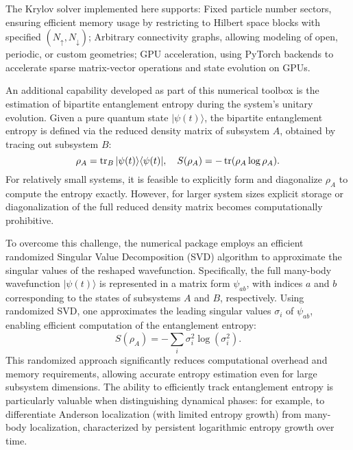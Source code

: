 The Krylov solver implemented here supports: {Fixed particle number sectors}, ensuring efficient memory usage by restricting to Hilbert space blocks with specified $(N_\uparrow, N_\downarrow)$; {Arbitrary connectivity graphs}, allowing modeling of open, periodic, or custom geometries; {GPU acceleration}, using PyTorch backends to accelerate sparse matrix-vector operations and state evolution on GPUs.


An additional capability developed as part of this numerical toolbox is the estimation of bipartite entanglement entropy during the system's unitary evolution. Given a pure quantum state $|\psi(t)\rangle$, the bipartite entanglement entropy is defined via the reduced density matrix of subsystem $A$, obtained by tracing out subsystem $B$:
\begin{equation}
\rho_A = \mathop{\mathrm{tr}}\nolimits_B |\psi(t)\rangle \langle \psi(t)|,\quad
S(\rho_A) = -\mathop{\mathrm{tr}}\nolimits(\rho_A \log \rho_A).
\end{equation}
For relatively small systems, it is feasible to explicitly form and diagonalize $\rho_A$ to compute the entropy exactly. However, for larger system sizes explicit storage or diagonalization of the full reduced density matrix becomes computationally prohibitive.

To overcome this challenge, the numerical package employs an efficient randomized Singular Value Decomposition (SVD) algorithm \cite{halko_finding_2011} to approximate the singular values of the reshaped wavefunction. Specifically, the full many-body wavefunction $|\psi(t)\rangle$ is represented in a matrix form $\psi_{ab}$, with indices $a$ and $b$ corresponding to the states of subsystems $A$ and $B$, respectively. Using randomized SVD, one approximates the leading singular values ${\sigma_i}$ of $\psi_{ab}$, enabling efficient computation of the entanglement entropy:
\begin{equation}
S(\rho_A) = -\sum_i \sigma_i^2 \log(\sigma_i^2).
\end{equation}
This randomized approach significantly reduces computational overhead and memory requirements, allowing accurate entropy estimation even for large subsystem dimensions. The ability to efficiently track entanglement entropy is particularly valuable when distinguishing dynamical phases: for example, to differentiate Anderson localization (with limited entropy growth) from many-body localization, characterized by persistent logarithmic entropy growth over time.



